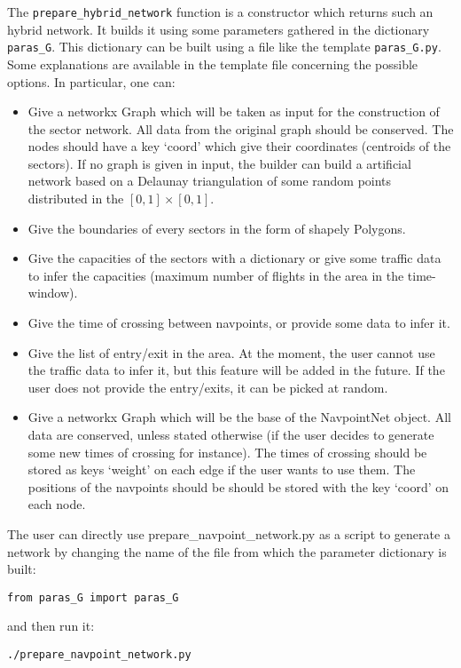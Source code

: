 \documentclass[12pt]{article}
\begin{document}
The \verb|prepare_hybrid_network| function is a constructor which returns such an hybrid network. It builds it using some parameters gathered in the dictionary \verb|paras_G|. This dictionary can be built using a file like the template \verb|paras_G.py|. Some explanations are available in the template file concerning the possible options. In particular, one can:
\begin{itemize}
\item Give a networkx Graph which will be taken as input for the construction of the sector network. All data from the original graph should be conserved. The nodes should have a key `coord' which give their coordinates (centroids of the  sectors). If no graph is given in input, the builder can build a artificial network based on a Delaunay triangulation of some random points distributed in the $[0, 1]\times[0, 1]$.
\item Give the boundaries of every sectors in the form of shapely Polygons.
\item Give the capacities of the sectors with a dictionary or give some traffic data to infer the capacities (maximum number of flights in the area in the time-window).
\item Give the time of crossing between navpoints, or provide some data to infer it.
\item Give the list of entry/exit in the area. At the moment, the user cannot use the traffic data to infer it, but this feature will be added in the future. If the user does not provide the entry/exits, it can be picked at random.
\item Give a networkx Graph which will be the base of the NavpointNet object. All data are conserved, unless stated otherwise (if the user decides to generate some new times of crossing for instance). The times of crossing should be stored as keys `weight' on each edge if the user wants to use them. The positions of the navpoints should be should be stored with the key `coord' on each node.
\end{itemize}

The user can directly use prepare\_navpoint\_network.py as a script to generate a network by changing the name of the file from which the parameter dictionary is built:
\begin{verbatim}
from paras_G import paras_G
\end{verbatim}
and then run it:
\begin{verbatim}
./prepare_navpoint_network.py
\end{verbatim}
\end{document}
